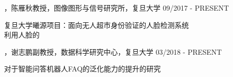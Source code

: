 
\begin{cventries}

\cvexperience
{，陈雁秋教授，图像图形与信号研究所，复旦大学}
{09/2017 - PRESENT}
{
    \begin{cvitems}
    \item {复旦大学曦源项目：面向无人超市身份验证的人脸检测系统\\利用人脸的}
    \end{cvitems}
}

\cvexperience
{，谢志鹏副教授，数据科学研究中心，复旦大学}
{03/2018 - PRESENT}
{
    \begin{cvitems}
    \item {对于智能问答机器人FAQ的泛化能力的提升的研究}
    \end{cvitems}
}
\end{cventries}